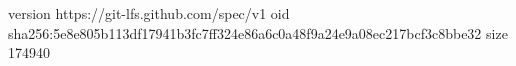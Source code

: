 version https://git-lfs.github.com/spec/v1
oid sha256:5e8e805b113df17941b3fc7ff324e86a6c0a48f9a24e9a08ec217bcf3c8bbe32
size 174940

